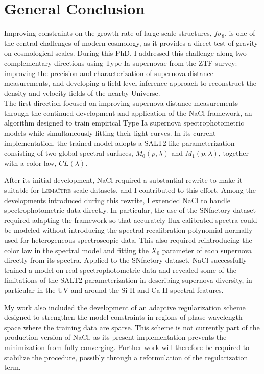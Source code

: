 \section{General Conclusion}


Improving constraints on the growth rate of large-scale structures, 
$f\sigma_8$, is one of the central challenges of modern cosmology, as it 
provides a direct test of gravity on cosmological scales. During this 
PhD, I addressed this challenge along two complementary directions using 
Type Ia supernovae from the ZTF survey: improving the precision and 
characterization of supernova distance measurements, and developing a 
field-level inference approach to reconstruct the density and velocity 
fields of the nearby Universe. \\

The first direction focused on improving supernova distance measurements 
through the continued development and application of the NaCl framework, 
an algorithm designed to train empirical Type Ia supernova 
spectrophotometric models while simultaneously fitting their light 
curves. In its current implementation, the trained model adopts a 
SALT2-like parameterization consisting of two global spectral surfaces, 
$M_0(p,\lambda)$ and $M_1(p,\lambda)$, together with a color law, 
$CL(\lambda)$. 

After its initial development, NaCl required a substantial rewrite to 
make it suitable for \textsc{Lemaître}-scale datasets, and I contributed to this  
effort. Among the developments introduced during this rewrite, I 
extended NaCl to handle spectrophotometric data directly. In particular, 
the use of the SNfactory dataset required adapting the framework so that 
accurately flux-calibrated spectra could be modeled without introducing 
the spectral recalibration polynomial normally used for heterogeneous 
spectroscopic data. This also required reintroducing the color law in 
the spectral model and fitting the $X_0$ parameter of each supernova 
directly from its spectra. Applied to the SNfactory dataset, NaCl 
successfully trained a model on real spectrophotometric data and 
revealed some of the limitations of the SALT2 parameterization in 
describing supernova diversity, in particular in the UV and around the 
Si II and Ca II spectral features.

My work also included the development of an adaptive regularization 
scheme designed to strengthen the model constraints in regions of 
phase-wavelength space where the training data are sparse. This scheme 
is not currently part of the production version of NaCl, as its present 
implementation prevents the minimization from fully converging. Further 
work will therefore be required to stabilize the procedure, possibly 
through a reformulation of the regularization term. 

